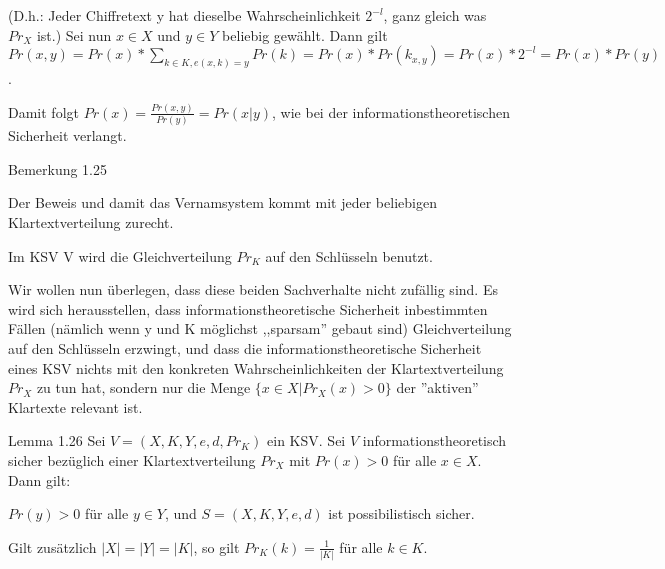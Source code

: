 \documentclass[a4paper]{article}
\begin{document}
\begin{multicols}{3}
    (D.h.: Jeder Chiffretext y hat dieselbe Wahrscheinlichkeit $2^{-l}$, ganz gleich was $Pr_X$ ist.)
    Sei nun $x\in X$ und $y\in Y$ beliebig gewählt. Dann gilt $Pr(x,y) = Pr(x)*\sum_{k\in K, e(x,k)=y} Pr(k) = Pr(x)*Pr(k_{x,y}) = Pr(x)* 2^{-l}= Pr(x)*Pr(y)$.

    Damit folgt $Pr(x)=\frac{Pr(x,y)}{Pr(y)}= Pr(x|y)$, wie bei der informationstheoretischen Sicherheit verlangt.

    Bemerkung 1.25
    \begin{enumerate*}
        \item Der Beweis und damit das Vernamsystem kommt mit jeder beliebigen Klartextverteilung zurecht.
        \item  Im KSV V wird die Gleichverteilung $Pr_K$ auf den Schlüsseln benutzt.
    \end{enumerate*}

    Wir wollen nun überlegen, dass diese beiden Sachverhalte nicht zufällig sind.  Es wird sich herausstellen, dass informationstheoretische Sicherheit inbestimmten  Fällen (nämlich wenn y und K möglichst ,,sparsam'' gebaut sind) Gleichverteilung auf den Schlüsseln erzwingt, und dass die informationstheoretische Sicherheit eines KSV nichts mit den konkreten Wahrscheinlichkeiten der Klartextverteilung $Pr_X$ zu tun hat, sondern nur die Menge $\{x\in X|Pr_X(x)> 0\}$ der ''aktiven'' Klartexte relevant ist.

    Lemma 1.26 Sei $V=(X,K,Y,e,d,Pr_K)$ ein KSV. Sei $V$ informationstheoretisch sicher bezüglich einer Klartextverteilung $Pr_X$ mit $Pr(x)>0$ für alle $x\in X$. Dann gilt:
    \begin{enumerate*}
        \item $Pr(y)>0$ für alle $y\in Y$, und $S=(X,K,Y,e,d)$ ist possibilistisch sicher.
        \item  Gilt zusätzlich $|X|=|Y|=|K|$, so gilt $Pr_K(k)=\frac{1}{|K|}$ für alle $k\in K$.
    \end{enumerate*}


\end{multicols}
\end{document}
